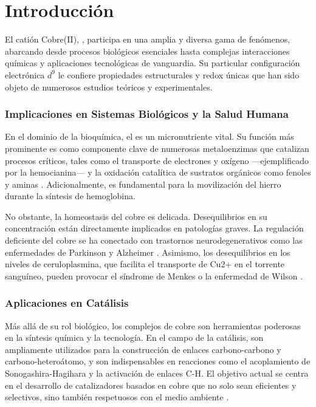\chapter{Introducción}

El catión Cobre(II), , participa en una amplia y diversa gama de fenómenos, abarcando desde procesos biológicos esenciales hasta complejas interacciones químicas y aplicaciones tecnológicas de vanguardia. Su particular configuración electrónica $d^9$ le confiere propiedades estructurales y redox únicas que han sido objeto de numerosos estudios teóricos y experimentales.

    \subsection*{Implicaciones en Sistemas Biológicos y la Salud Humana}

    En el dominio de la bioquímica, el  es un micronutriente vital. Su función más prominente es como componente clave de numerosas metaloenzimas que catalizan procesos críticos, tales como el transporte de electrones y oxígeno —ejemplificado por la hemocianina— y la oxidación catalítica de sustratos orgánicos como fenoles y aminas \cite{Cu-2014-01, Wa-2024-03, Wa-2017-01, Wa-2009-01}. Adicionalmente, es fundamental para la movilización del hierro durante la síntesis de hemoglobina.

    No obstante, la homeostasis del cobre es delicada. Desequilibrios en su concentración están directamente implicados en patologías graves. La regulación deficiente del cobre se ha conectado con trastornos neurodegenerativos como las enfermedades de Parkinson y Alzheimer \cite{Cu-2014-02,Cu-2011-02, Cu-2012-01}. Asimismo, los desequilibrios en los niveles de ceruloplasmina, que facilita el transporte de Cu2+ en el torrente sanguíneo, pueden provocar el síndrome de Menkes o la enfermedad de Wilson \cite{Cu-2001-01, Cu-2017-01}.

    \subsection*{Aplicaciones en Catálisis}

    Más allá de su rol biológico, los complejos de cobre son herramientas poderosas en la síntesis química y la tecnología. En el campo de la catálisis, son ampliamente utilizados para la construcción de enlaces carbono-carbono y carbono-heteroátomo, y son indispensables en reacciones como el acoplamiento de Sonogashira-Hagihara y la activación de enlaces C-H. El objetivo actual se centra en el desarrollo de catalizadores basados en cobre que no solo sean eficientes y selectivos, sino también respetuosos con el medio ambiente \cite{Cu-2014-01}.

